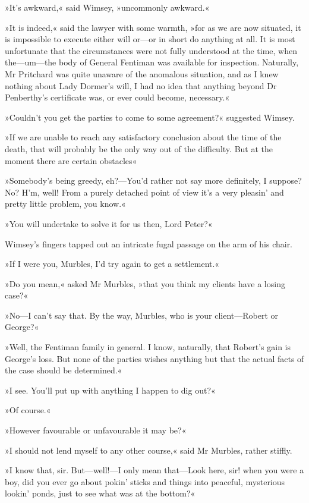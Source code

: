»It's awkward,« said Wimsey, »uncommonly awkward.«

»It is indeed,« said the lawyer with some warmth, »for as we are now situated, it is impossible to execute either will or—or in short do anything at all. It is most unfortunate that the circumstances were not fully understood at the time, when the—um—the body of General Fentiman was available for inspection. Naturally, Mr Pritchard was quite unaware of the anomalous situation, and as I knew nothing about Lady Dormer's will, I had no idea that anything beyond Dr Penberthy's certificate was, or ever could become, necessary.«

»Couldn't you get the parties to come to some agreement?« suggested Wimsey.

»If we are unable to reach any satisfactory conclusion about the time of the death, that will probably be the only way out of the difficulty. But at the moment there are certain obstacles\longdash«

»Somebody's being greedy, eh?—You'd rather not say more definitely, I suppose? No? H'm, well! From a purely detached point of view it's a very pleasin' and pretty little problem, you know.«

»You will undertake to solve it for us then, Lord Peter?«

Wimsey's fingers tapped out an intricate fugal passage on the arm of his chair.

»If I were you, Murbles, I'd try again to get a settlement.«

»Do you mean,« asked Mr Murbles, »that you think my clients have a losing case?«

»No—I can't say that. By the way, Murbles, who is your client—Robert or George?«

»Well, the Fentiman family in general. I know, naturally, that Robert's gain is George's loss. But none of the parties wishes anything but that the actual facts of the case should be determined.«

»I see. You'll put up with anything I happen to dig out?«

»Of course.«

»However favourable or unfavourable it may be?«

»I should not lend myself to any other course,« said Mr Murbles, rather stiffly.

»I know that, sir. But—well!—I only mean that—Look here, sir! when you were a boy, did you ever go about pokin' sticks and things into peaceful, mysterious lookin' ponds, just to see what was at the bottom?«

